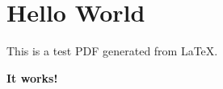 \documentclass{article}
\begin{document}
\section*{Hello World}

This is a test PDF generated from LaTeX.

\textbf{It works!}
\end{document}
